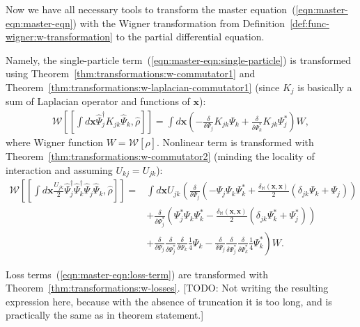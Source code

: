 \documentclass[12pt,aip,jmp,amssymb,amsmath]{revtex4-1}
\begin{document}
Now we have all necessary tools to transform the master equation~(\ref{eqn:master-eqn:master-eqn}) with the Wigner transformation from Definition~\ref{def:func-wigner:w-transformation} to the partial differential equation.

Namely, the single-particle term~(\ref{eqn:master-eqn:single-particle}) is transformed using Theorem~\ref{thm:transformations:w-commutator1} and Theorem~\ref{thm:transformations:w-laplacian-commutator1} (since $K_j$ is basically a sum of Laplacian operator and functions of $\boldsymbol{x}$):
\begin{eqnarray}
    \mathcal{W} \left[ [ \int d\boldsymbol{x} \hat{\Psi}_j^\dagger K_{jk} \hat{\Psi}_k, \hat{\rho} ] \right]
    = \int d\boldsymbol{x} \left(
            - \frac{\delta}{\delta \Psi_j} K_{jk} \Psi_k
            + \frac{\delta}{\delta \Psi_k^*} K_{jk} \Psi_j^*
        \right)
        W,
\end{eqnarray}
where Wigner function $W = \mathcal{W}[\hat{\rho}]$.
Nonlinear term is transformed with Theorem~\ref{thm:transformations:w-commutator2} (minding the locality of interaction and assuming $U_{kj} = U_{jk}$):
\begin{eqnarray}
    \mathcal{W} \left[
        [
            \int d\boldsymbol{x} \frac{U_{jk}}{2}
                \hat{\Psi}_j^\dagger \hat{\Psi}_k^\dagger \hat{\Psi}_j \hat{\Psi}_k,
            \hat{\rho}
        ]
    \right]
    = & \int d\boldsymbol{x} U_{jk} \left(
        \frac{\delta}{\delta \Psi_j} \left(
            - \Psi_j \Psi_k \Psi_k^*
            + \frac{\delta_{\mathbb{M}}(\boldsymbol{x}, \boldsymbol{x})}{2} ( \delta_{jk} \Psi_k + \Psi_j )
        \right) \right. \\
    &   \left. + \frac{\delta}{\delta \Psi_j^*} \left(
            \Psi_j^* \Psi_k \Psi_k^*
            - \frac{\delta_{\mathbb{M}}(\boldsymbol{x}, \boldsymbol{x})}{2} ( \delta_{jk} \Psi_k^* + \Psi_j^* )
        \right) \right. \\
    &   \left.
            + \frac{\delta}{\delta \Psi_j}
            \frac{\delta}{\delta \Psi_j^*}
            \frac{\delta}{\delta \Psi_k}
            \frac{1}{4} \Psi_k
            - \frac{\delta}{\delta \Psi_j}
            \frac{\delta}{\delta \Psi_j^*}
            \frac{\delta}{\delta \Psi_k^*}
            \frac{1}{4} \Psi_k^*
        \right) W.
\end{eqnarray}

Loss terms~(\ref{eqn:master-eqn:loss-term}) are transformed with Theorem~\ref{thm:transformations:w-losses}.
[TODO: Not writing the resulting expression here, because with the absence of truncation it is too long, and is practically the same as in theorem statement.]
\end{document}
